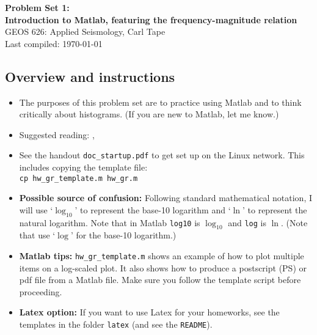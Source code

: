 \documentclass[11pt,titlepage,fleqn]{article}
\begin{document}

\begin{spacing}{1.2}
\centering
{\large \bf Problem Set 1: \\
Introduction to Matlab, featuring the frequency-magnitude relation} \\
GEOS 626: Applied Seismology, Carl Tape \\
Last compiled: \today
\end{spacing}


\subsection*{Overview and instructions}

\begin{itemize}

\item The purposes of this problem set are to practice using Matlab and to think critically about histograms. (If you are new to Matlab, let me know.)

\item Suggested reading: \citet[][Section 4.7.1]{SteinWysession}, \citet{GutenbergRichter1944}

\item See the handout \verb+doc_startup.pdf+ to get set up on the Linux network. This includes copying the template file: \\
\verb+cp hw_gr_template.m hw_gr.m+

\item {\bf Possible source of confusion:} Following standard mathematical notation, I will use `$\log_{10}$' to represent the base-10 logarithm and `$\ln$' to represent the natural logarithm. Note that in Matlab \verb+log10+ is $\log_{10}$ and \verb+log+ is $\ln$. (Note that \citet{SteinWysession} use `$\log$' for the base-10 logarithm.)

\item {\bf Matlab tips:}
\verb+hw_gr_template.m+ shows an example of how to plot multiple items on a log-scaled plot. It also shows how to produce a postscript (PS) or pdf file from a Matlab file. Make sure you follow the template script before proceeding.

\item {\bf Latex option:}
If you want to use Latex for your homeworks, see the templates in the folder \verb+latex+ (and see the \verb+README+).

\end{itemize}
\end{document}
